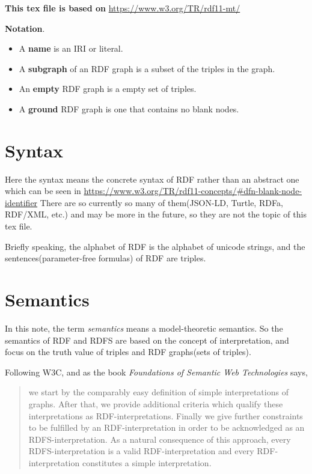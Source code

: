 \documentclass{article}
\begin{document}
\noindent \textbf{This tex file is based on} \newline
\url{https://www.w3.org/TR/rdf11-mt/}\newline

\noindent \textbf{Notation}.
\begin{itemize}
\item A \textbf{name} is an IRI or literal. 
\item A \textbf{subgraph} of an RDF graph is a subset of the triples in the graph. 
\item An \textbf{empty} RDF graph is a empty set of triples.
\item A \textbf{ground} RDF graph is one that contains no blank nodes.
\end{itemize}

\section{Syntax}
Here the syntax means the concrete syntax of RDF rather than an abstract one which can be seen in \newline
\url{https://www.w3.org/TR/rdf11-concepts/#dfn-blank-node-identifier}
\newline \noindent There are so currently so many of them(JSON-LD, Turtle, RDFa, RDF/XML, etc.) and may be more in the future, so they are not the topic of this tex file.\newline

\noindent Briefly speaking, the alphabet of RDF is the alphabet of unicode strings, and 
the sentences(parameter-free formulas) of RDF are triples.


\section{Semantics}

In this note, the term \textit{semantics} means a model-theoretic semantics. So the semantics of RDF and RDFS are based on the concept of interpretation, and focus on the truth value of triples and RDF graphs(sets of triples).

Following W3C, and as the book \textit{Foundations of Semantic Web Technologies} says\cite{book}, \newline
\begin{quotation}
we start by the comparably easy definition of simple interpretations of graphs. After that, we provide additional criteria which qualify these interpretations as RDF-interpretations. Finally we give further constraints to be fulfilled by an RDF-interpretation in order to be acknowledged as an RDFS-interpretation. As a natural consequence of this approach, every RDFS-interpretation is a valid RDF-interpretation and every RDF-interpretation constitutes a simple interpretation.
\end{quotation}
\newpage 
\end{document}
